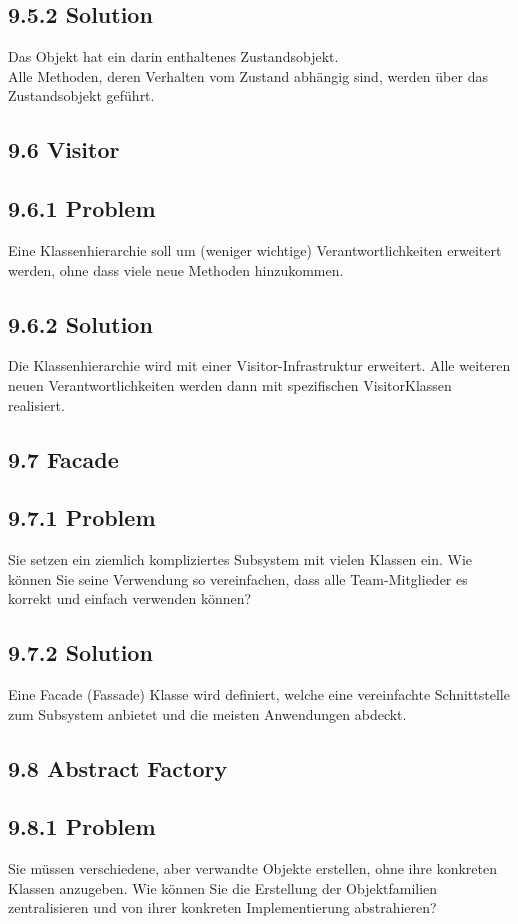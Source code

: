 \subsection*{9.5.2 Solution}
Das Objekt hat ein darin enthaltenes Zustandsobjekt.\\
Alle Methoden, deren Verhalten vom Zustand abhängig sind, werden über das Zustandsobjekt geführt.

\subsection*{9.6 Visitor}
\subsection*{9.6.1 Problem}
Eine Klassenhierarchie soll um (weniger wichtige) Verantwortlichkeiten erweitert werden, ohne dass viele neue Methoden hinzukommen.

\subsection*{9.6.2 Solution}
Die Klassenhierarchie wird mit einer Visitor-Infrastruktur erweitert. Alle weiteren neuen Verantwortlichkeiten werden dann mit spezifischen VisitorKlassen realisiert.

\subsection*{9.7 Facade}
\subsection*{9.7.1 Problem}
Sie setzen ein ziemlich kompliziertes Subsystem mit vielen Klassen ein. Wie können Sie seine Verwendung so vereinfachen, dass alle Team-Mitglieder es korrekt und einfach verwenden können?

\subsection*{9.7.2 Solution}
Eine Facade (Fassade) Klasse wird definiert, welche eine vereinfachte Schnittstelle zum Subsystem anbietet und die meisten Anwendungen abdeckt.

\subsection*{9.8 Abstract Factory}
\subsection*{9.8.1 Problem}
Sie müssen verschiedene, aber verwandte Objekte erstellen, ohne ihre konkreten Klassen anzugeben. Wie können Sie die Erstellung der Objektfamilien zentralisieren und von ihrer konkreten Implementierung abstrahieren?

